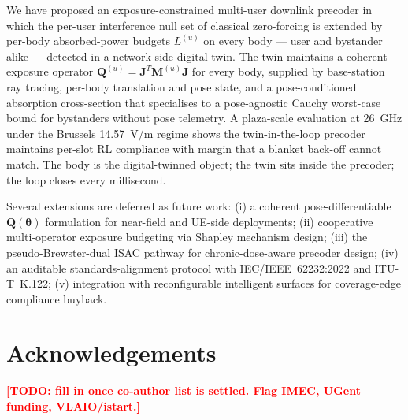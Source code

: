 \documentclass[journal,twoside,onecolumn]{IEEEtran}
\theoremstyle{definition}
\newcommand{\TODO}[1]{\textcolor{red}{\textbf{[TODO: #1]}}}
\newcommand{\Q}{\mathbf{Q}}
\newcommand{\Jmat}{\mathbf{J}}
\newcommand{\Mmat}{\mathbf{M}}
\begin{document}
We have proposed an exposure-constrained multi-user downlink
precoder in which the per-user interference null set of classical
zero-forcing is extended by per-body absorbed-power budgets
$L^{(u)}$ on every body --- user and bystander alike --- detected
in a network-side digital twin. The twin maintains a coherent
exposure operator $\Q^{(u)}=\Jmat^T\Mmat^{(u)}\Jmat$ for every
body, supplied by base-station ray tracing, per-body translation
and pose state, and a pose-conditioned absorption cross-section
that specialises to a pose-agnostic Cauchy worst-case bound for
bystanders without pose telemetry. A plaza-scale evaluation at
26~GHz under the Brussels 14.57~V/m regime shows the twin-in-the-loop
precoder maintains per-slot RL compliance with margin that a
blanket back-off cannot match. The body is the
digital-twinned object; the twin sits inside the
precoder; the loop closes every millisecond.

Several extensions are deferred as future work: (i) a coherent
pose-differentiable $\Q(\bm\theta)$ formulation for near-field and
UE-side deployments; (ii) cooperative multi-operator exposure
budgeting via Shapley mechanism design; (iii) the
pseudo-Brewster-dual ISAC pathway for chronic-dose-aware precoder
design; (iv) an auditable standards-alignment protocol with
IEC/IEEE~62232:2022 and ITU-T~K.122; (v) integration with
reconfigurable intelligent surfaces for coverage-edge compliance
buyback.

\section*{Acknowledgements}

\TODO{fill in once co-author list is settled. Flag IMEC, UGent
funding, VLAIO/istart.}
\end{document}

